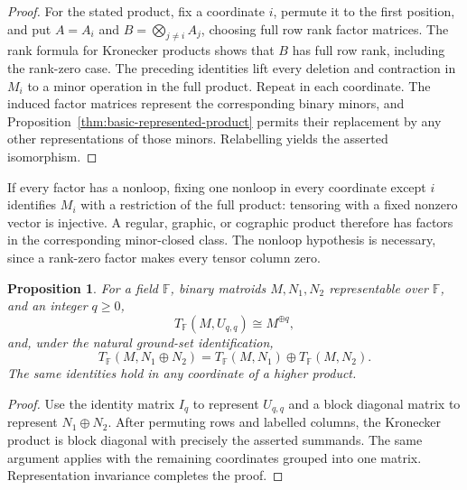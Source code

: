 \documentclass[12pt,a4paper]{article}
\numberwithin{equation}{section}
\newcommand{\F}{\mathbb F}
\newtheorem{proposition}[proposition]{Proposition}
\theoremstyle{definition}
\theoremstyle{remark}
\begin{document}
\begin{proof}
For the stated product, fix a coordinate \(i\), permute it to the
first position, and put \(A=A_i\) and
\(B=\bigotimes_{j\ne i}A_j\), choosing full row rank factor matrices.
The rank formula for Kronecker products shows that \(B\) has full
row rank, including the rank-zero case.  The preceding identities
lift every deletion and contraction in \(M_i\) to a minor operation
in the full product.  Repeat in each coordinate.  The induced factor
matrices represent the corresponding binary minors, and
Proposition~\ref{thm:basic-represented-product} permits their
replacement by any other representations of those minors.
Relabelling yields the asserted isomorphism.
\end{proof}

If every factor has a nonloop, fixing one nonloop in every
coordinate except \(i\) identifies \(M_i\) with a restriction of
the full product: tensoring with a fixed nonzero vector is injective.
A regular, graphic, or cographic product therefore has factors in the
corresponding minor-closed class.  The nonloop hypothesis is necessary,
since a rank-zero factor makes every tensor column zero.

\begin{proposition}\label{prop:tensor-direct-sums}
For a field \(\F\), binary matroids \(M,N_1,N_2\) representable over
\(\F\), and an integer \(q\ge0\),
\begin{equation}\label{eq:free-factor}
 T_{\F}(M,U_{q,q})\cong M^{\oplus q},
\end{equation}
and, under the natural ground-set identification,
\[
T_{\F}(M,N_1\oplus N_2)
 =T_{\F}(M,N_1)\oplus T_{\F}(M,N_2).
\]
The same identities hold in any coordinate of a higher product.
\end{proposition}
\begin{proof}
Use the identity matrix \(I_q\) to represent \(U_{q,q}\) and a
block diagonal matrix to represent \(N_1\oplus N_2\).
After permuting rows and labelled columns, the Kronecker product
is block diagonal with precisely the asserted summands.  The same
argument applies with the remaining coordinates grouped into one
matrix.  Representation invariance completes the proof.
\end{proof}
\end{document}
